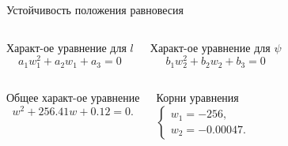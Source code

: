 \documentclass[ignoreonframetext,unicode]{beamer}
\begin{document}
\begin{frame}{Устойчивость положения равновесия}
\begin{columns}
\end{columns}

\vspace*{-2mm}
\begin{columns}
	
	\begin{block}{Характ-ое уравнение для $l$}
		\vspace*{2mm}
		\begin{equation*} 
			a_1 w_1^2	+ a_2 w_1 + a_3 = 0
		\end{equation*}
	\end{block}
	
	\begin{block}{Характ-ое уравнение для $\psi$}
		\vspace*{2mm}
		\begin{equation*}
			b_1 w_2^2	+ b_2 w_2 + b_3 = 0
		\end{equation*}
	\end{block}
	
\end{columns}

\vspace*{-2mm}
\begin{columns}
	
	\begin{block}{Общее характ-ое уравнение}
		\vspace*{2mm}
		\begin{equation*} 
			w^2 + 256.41 w + 0.12 = 0.
		\end{equation*}
	\end{block}
	
	\begin{block}{Корни уравнения}
		\vspace*{2mm}
		\begin{equation*}
			\begin{cases}
				w_1 = -256, \\
				w_2 = -0.00047.
			\end{cases}
		\end{equation*}
	\end{block}
	
\end{columns}


	
\end{frame}
\end{document}

